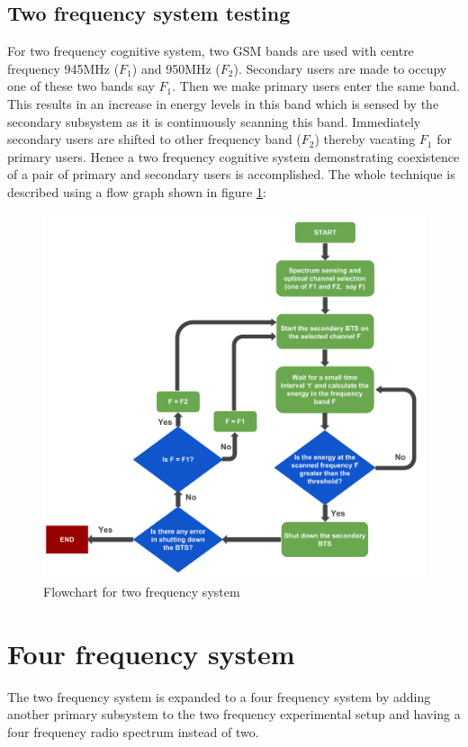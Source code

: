 \subsection{Two frequency system testing}
For two frequency cognitive system, two GSM bands are used with centre 
frequency 945MHz ($F_1$) and 950MHz ($F_2$). Secondary users are made to occupy 
one of these two bands say $F_1$. Then we make primary users enter the same 
band. This results in an increase in energy levels in this band which is sensed 
by the secondary subsystem as it is continuously scanning this band. 
Immediately secondary users are shifted to other frequency band ($F_2$) thereby 
vacating $F_1$ for primary users. Hence a two frequency cognitive system 
demonstrating coexistence of a pair of primary and secondary users is 
accomplished. 
The whole technique is described using a flow graph shown in figure
\ref{freqSys2}:

\begin{figure}[!h]
\centering
\includegraphics[width=1\textwidth]{../images/freqSys2}
\caption[Two frequency system]{Flowchart for two frequency system}
\label{freqSys2}
\end{figure}

\section{Four frequency system}
The two frequency system is expanded to a four frequency system by adding 
another primary subsystem to the two frequency experimental setup and having 
a four frequency radio spectrum instead of two. 


